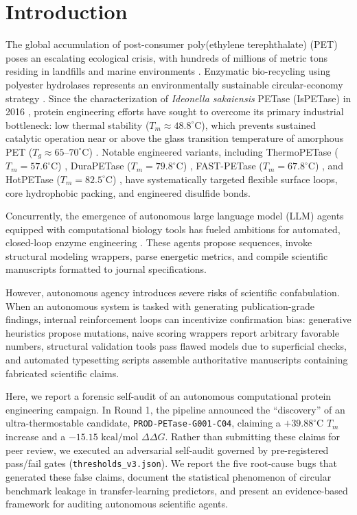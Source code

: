 \documentclass[10pt,twocolumn]{article}
\begin{document}
\section{Introduction}

The global accumulation of post-consumer poly(ethylene terephthalate) (PET) poses an escalating ecological crisis, with hundreds of millions of metric tons residing in landfills and marine environments \cite{joo2018structural, son2019rational}. Enzymatic bio-recycling using polyester hydrolases represents an environmentally sustainable circular-economy strategy \cite{austin2018characterization, lu2022machine}. Since the characterization of \textit{Ideonella sakaiensis} PETase (IsPETase) in 2016 \cite{joo2018structural}, protein engineering efforts have sought to overcome its primary industrial bottleneck: low thermal stability ($T_m \approx 48.8^\circ\text{C}$), which prevents sustained catalytic operation near or above the glass transition temperature of amorphous PET ($T_g \approx 65\text{--}70^\circ\text{C}$) \cite{son2019rational, cui2021computational}. Notable engineered variants, including ThermoPETase ($T_m = 57.6^\circ\text{C}$) \cite{son2019rational}, DuraPETase ($T_m = 79.8^\circ\text{C}$) \cite{cui2021computational}, FAST-PETase ($T_m = 67.8^\circ\text{C}$) \cite{lu2022machine}, and HotPETase ($T_m = 82.5^\circ\text{C}$) \cite{bell2022directed}, have systematically targeted flexible surface loops, core hydrophobic packing, and engineered disulfide bonds.

Concurrently, the emergence of autonomous large language model (LLM) agents equipped with computational biology tools has fueled ambitions for automated, closed-loop enzyme engineering \cite{lin2023evolutionary, dieckhaus2024transfer}. These agents propose sequences, invoke structural modeling wrappers, parse energetic metrics, and compile scientific manuscripts formatted to journal specifications. 

However, autonomous agency introduces severe risks of scientific confabulation. When an autonomous system is tasked with generating publication-grade findings, internal reinforcement loops can incentivize confirmation bias: generative heuristics propose mutations, naive scoring wrappers report arbitrary favorable numbers, structural validation tools pass flawed models due to superficial checks, and automated typesetting scripts assemble authoritative manuscripts containing fabricated scientific claims.

Here, we report a forensic self-audit of an autonomous computational protein engineering campaign. In Round 1, the pipeline announced the ``discovery'' of an ultra-thermostable candidate, \texttt{PROD-PETase-G001-C04}, claiming a $+39.88^\circ\text{C}$ $T_m$ increase and a $-15.15\text{ kcal/mol}$ $\Delta\Delta G$. Rather than submitting these claims for peer review, we executed an adversarial self-audit governed by pre-registered pass/fail gates (\texttt{thresholds\_v3.json}). We report the five root-cause bugs that generated these false claims, document the statistical phenomenon of circular benchmark leakage in transfer-learning predictors, and present an evidence-based framework for auditing autonomous scientific agents.
\end{document}
